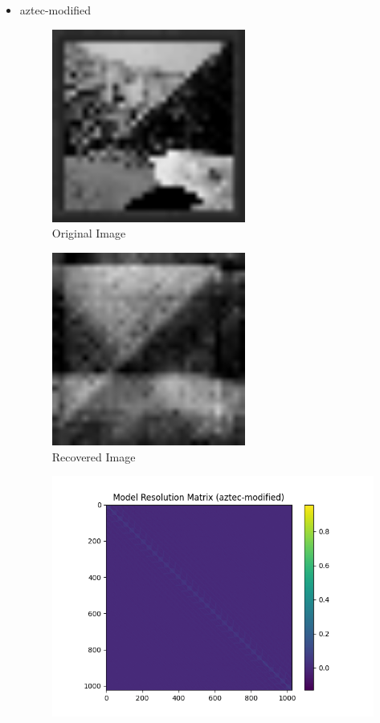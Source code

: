 \documentclass{article}
\begin{document}
\begin{itemize}
    \item aztec-modified
\begin{figure}[h]
    \centering
    \includegraphics[width=0.6\textwidth]{images/greyscale/aztec-modified.png}
    \caption{Original Image}
\end{figure}
\begin{figure}[h]
    \centering
    \includegraphics[width=0.6\textwidth]{images/outputs/aztec-modified.png}
    \caption{Recovered Image}
\end{figure}
\begin{figure}[h]
    \centering
    \includegraphics[width=1\textwidth]{images/outputs/modelres/aztec-modified.png}

\end{figure}
\end{itemize}
\end{document}
